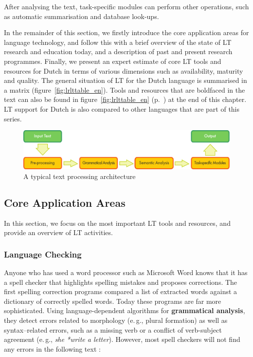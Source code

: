 \documentclass[]{../../metanetpaper}
\begin{document}
\begin{multicols}{2}
After analysing the text, task-specific modules can perform other operations, such as automatic summarisation and database look-ups.

In the remainder of this section, we firstly introduce the core application areas for language technology, and follow this with a brief overview of the state of LT research and education today, and a description of past and present research programmes. Finally, we present an expert estimate of core LT tools and resources for Dutch in terms of various dimensions such as availability, maturity and quality. The general situation of LT for the Dutch language is summarised in a matrix (figure~\ref{fig:lrlttable_en}). Tools and resources that are boldfaced in the text can also be found in figure~\ref{fig:lrlttable_en} (p.~\pageref{fig:lrlttable_en}) at the end of this chapter. LT support for Dutch is also compared to other languages that are part of this series.

\begin{figure}[htb]
  \center
  \includegraphics[width=\textwidth]{../_media/english/text_processing_app_architecture}
  \caption{A typical text processing architecture}
  \label{fig:textprocessingarch_en}
\end{figure}

\subsection{Core Application Areas}

In this section, we focus on the most important LT tools and resources, and provide an overview of LT activities. 

\subsubsection{Language Checking}

Anyone who has used a word processor such as Microsoft Word knows that it has a spell checker that highlights spelling mistakes and proposes corrections. The first spelling correction programs compared a list of extracted words against a dictionary of correctly spelled words. Today these programs are far more sophisticated. Using language-dependent algorithms for \textbf{grammatical analysis}, they detect errors related to morphology (e.\,g., plural formation) as well as syntax–related errors, such as a missing verb or a conflict of verb-subject agreement (e.\,g., \textit{she *write a letter}). However, most spell checkers will not find any errors in the following text \cite{zar1}:


\end{multicols}
\end{document}
